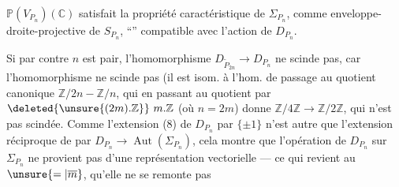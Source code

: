 $\mathbb P(V_{P_n})(\mathbb C)$ satisfait  la propriété caractéristique de $\Sigma_{P_n}$, comme enveloppe-droite-projective de  $S_{P_n}$, ``'' compatible avec l'action de $D_{P_n}$.

Si par contre $n$ est pair, l'homomorphisme  $D_{\widetilde P_{2n}}\longrightarrow D_{P_n}$ ne scinde pas, car l'homomorphisme
ne scinde pas (il est isom. à l'hom. de passage au quotient canonique $\mathbb Z/2n\mathbin{-}\mathbb Z/n$, qui en passant au quotient par $\deleted{\unsure{(2m).\mathbb Z}}\ m.\mathbb Z$ (où $n=2m$) donne $\mathbb Z/4\mathbb Z\longrightarrow\mathbb Z/2\mathbb Z$, qui n'est pas scindée.  Comme l'extension (8) de $D_{P_n}$ par $\{\pm1\}$ n'est autre que l'extension réciproque de
par $D_{P_n}\longrightarrow\operatorname{Aut}(\Sigma_{P_n})$, cela montre que l'opération de $D_{P_n}$ sur $\Sigma_{P_n}$ ne provient pas d'une représentation vectorielle —  ce qui revient au $\unsure{=|\overline m}$, qu'elle ne se remonte pas

